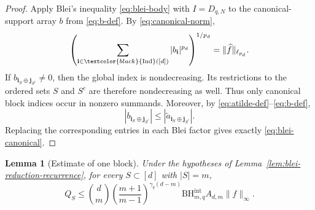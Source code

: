 \documentclass[11pt,a4paper]{article}
\numberwithin{equation}{section}
\theoremstyle{cleanplain}
\newtheorem{lemma}[lemma]{Lemma}
\theoremstyle{cleandefinition}
\theoremstyle{cleanremark}
\newcommand{\Ind}{\textcolor{black}{\operatorname{Ind}}}
\newcommand{\BHint}[2]{\mathrm{BH}^{\mathrm{int}}_{#1,#2}}
\begin{document}
\begin{proof}
Apply Blei's inequality \eqref{eq:blei-body} with $I=D_{q,N}$ to the
canonical-support array $b$ from \eqref{eq:b-def}.  By
\eqref{eq:canonical-norm},
\[
 \left(\sum_{\mathbf i\in\Ind([d])}|b_{\mathbf i}|^{p_d}\right)^{1/p_d}
 =\|\widehat f\|_{\ell_{p_d}}.
\]
If $b_{\mathbf i_S\oplus\mathbf j_{S^c}}\neq0$, then the global index is
nondecreasing.  Its restrictions to the ordered sets $S$ and $S^c$ are
therefore nondecreasing as well.  Thus only canonical block indices occur in
nonzero summands.  Moreover, by \eqref{eq:atilde-def}--\eqref{eq:b-def},
\[
 |b_{\mathbf i_S\oplus\mathbf j_{S^c}}|
 \leq |\widetilde a_{\mathbf i_S\oplus\mathbf j_{S^c}}|.
\]
Replacing the corresponding entries in each Blei factor gives exactly
\eqref{eq:blei-canonical}.
\end{proof}

\begin{lemma}[Estimate of one block]\label{lem:one-block-estimate}
Under the hypotheses of Lemma~\ref{lem:blei-reduction-recurrence}, for every
$S\subset[d]$ with $|S|=m$,
\begin{equation}\label{eq:QS-final}
 Q_S\leq
 \binom dm
 \left(\frac{m+1}{m-1}\right)^{\gamma_q(d-m)}
 \BHint{m}{q}A_{d,m}\|f\|_\infty.
\end{equation}
\end{lemma}
\end{document}
